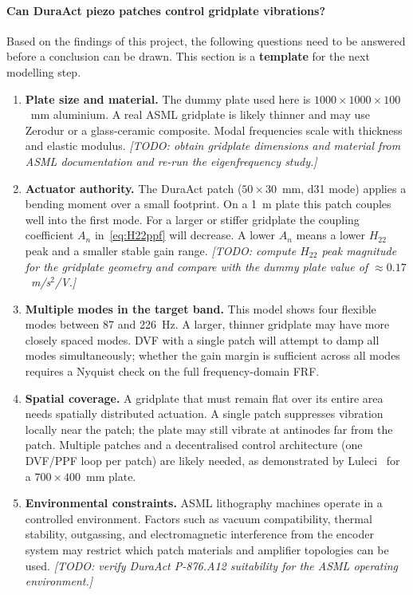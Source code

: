 \documentclass[12pt,a4paper]{article}
\begin{document}
\paragraph{Can DuraAct piezo patches control gridplate vibrations?}
Based on the findings of this project, the following questions need to be answered
before a conclusion can be drawn.  This section is a \textbf{template} for the
next modelling step.

\begin{enumerate}
  \item \textbf{Plate size and material.}
        The dummy plate used here is $1000 \times 1000 \times 100$~mm aluminium.
        A real ASML gridplate is likely thinner and may use Zerodur or a
        glass-ceramic composite.  Modal frequencies scale with thickness and
        elastic modulus.  \emph{[TODO: obtain gridplate dimensions and material
        from ASML documentation and re-run the eigenfrequency study.]}

  \item \textbf{Actuator authority.}
        The DuraAct patch ($50 \times 30$~mm, d31 mode) applies a bending moment
        over a small footprint.  On a 1~m plate this patch couples well into the
        first mode.  For a larger or stiffer gridplate the coupling coefficient
        $A_n$ in~\eqref{eq:H22ppf} will decrease.  A lower $A_n$ means a lower
        $H_{22}$ peak and a smaller stable gain range.
        \emph{[TODO: compute $H_{22}$ peak magnitude for the gridplate geometry
        and compare with the dummy plate value of $\approx 0.17$~m/s$^2$/V.]}

  \item \textbf{Multiple modes in the target band.}
        This model shows four flexible modes between 87 and 226~Hz.  A larger,
        thinner gridplate may have more closely spaced modes.  DVF with a single
        patch will attempt to damp all modes simultaneously; whether the gain margin
        is sufficient across all modes requires a Nyquist check on the full
        frequency-domain FRF.

  \item \textbf{Spatial coverage.}
        A gridplate that must remain flat over its entire area needs spatially
        distributed actuation.  A single patch suppresses vibration locally near
        the patch; the plate may still vibrate at antinodes far from the patch.
        Multiple patches and a decentralised control architecture (one
        DVF/PPF loop per patch) are likely needed, as demonstrated by
        Luleci~\cite{luleci2013} for a $700 \times 400$~mm plate.

  \item \textbf{Environmental constraints.}
        ASML lithography machines operate in a controlled environment.  Factors
        such as vacuum compatibility, thermal stability, outgassing, and
        electromagnetic interference from the encoder system may restrict which
        patch materials and amplifier topologies can be used.
        \emph{[TODO: verify DuraAct P-876.A12 suitability for the ASML
        operating environment.]}
\end{enumerate}
\end{document}
